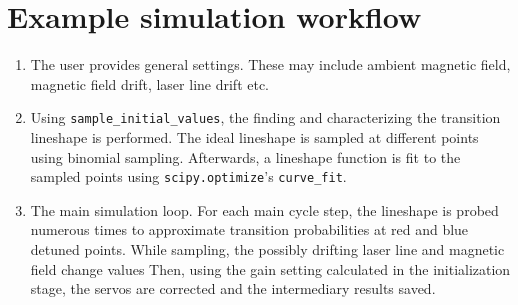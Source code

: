 \documentclass[a4paper,12pt]{article}
\begin{document}
\section{Example simulation workflow}

\begin{enumerate}
    \item The user provides general settings.
    These may include ambient magnetic field, magnetic field drift, 
    laser line drift etc.
    \item Using \texttt{sample\_initial\_values}, the finding and characterizing
    the transition lineshape is performed.
    The ideal lineshape is sampled at different points using binomial sampling.
    Afterwards, a lineshape function is fit to the sampled points using 
    \texttt{scipy.optimize}'s \texttt{curve\_fit}.
    \item The main simulation loop.
    For each main cycle step, the lineshape is probed numerous times to approximate
    transition probabilities at red and blue detuned points.
    While sampling, the possibly drifting laser line and magnetic field
    change values
    Then, using the gain setting calculated in the initialization stage, the 
    servos are corrected and the intermediary results saved.
\end{enumerate}


\end{document}

